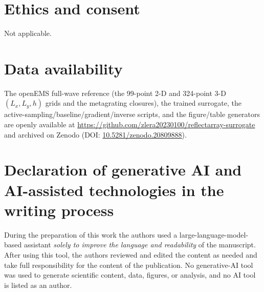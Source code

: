 \documentclass[11pt]{article}
\begin{document}
\section*{Ethics and consent}
Not applicable.

\section*{Data availability}
The openEMS full-wave reference (the 99-point 2-D and 324-point 3-D $(L_x,L_y,h)$ grids and the metagrating
closures), the trained surrogate, the active-sampling/baseline/gradient/inverse scripts, and the
figure/table generators are openly available at
\url{https://github.com/zlera20230100/reflectarray-surrogate} and archived on Zenodo
(DOI: \href{https://doi.org/10.5281/zenodo.20809888}{10.5281/zenodo.20809888}).

\section*{Declaration of generative AI and AI-assisted technologies in the writing process}
During the preparation of this work the authors used a large-language-model-based assistant \emph{solely to
improve the language and readability} of the manuscript. After using this tool, the authors reviewed and
edited the content as needed and take full responsibility for the content of the publication. No
generative-AI tool was used to generate scientific content, data, figures, or analysis, and no AI tool is
listed as an author.

\appendix
\end{document}
